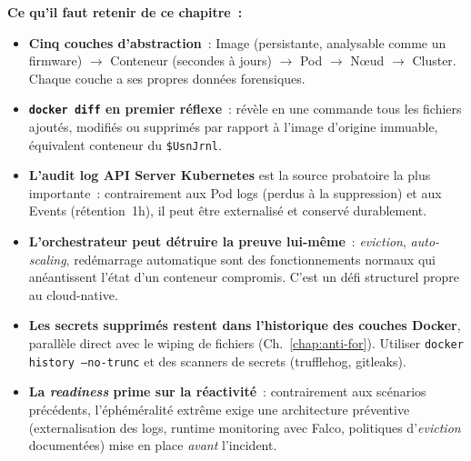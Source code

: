 \begin{boxresume}
\textbf{Ce qu'il faut retenir de ce chapitre~:}
\begin{itemize}
    \item \textbf{Cinq couches d'abstraction}~: Image (persistante,
          analysable comme un firmware) $\to$ Conteneur (secondes
          à jours) $\to$ Pod $\to$ N\oe ud $\to$ Cluster. Chaque
          couche a ses propres données forensiques.

    \item \textbf{\texttt{docker diff} en premier réflexe}~: révèle
          en une commande tous les fichiers ajoutés, modifiés ou
          supprimés par rapport à l'image d'origine immuable, équivalent conteneur du \texttt{\$UsnJrnl}.

    \item \textbf{L'audit log API Server Kubernetes} est la source
          probatoire la plus importante~: contrairement aux Pod logs
          (perdus à la suppression) et aux Events (rétention~1h),
          il peut être externalisé et conservé durablement.

    \item \textbf{L'orchestrateur peut détruire la preuve lui-même}~:
          \textit{eviction}, \textit{auto-scaling}, redémarrage
          automatique sont des fonctionnements normaux qui
          anéantissent l'état d'un conteneur compromis. C'est
          un défi structurel propre au cloud-native.

    \item \textbf{Les secrets supprimés restent dans l'historique
          des couches Docker}, parallèle direct avec le wiping
          de fichiers (Ch.~\ref{chap:anti-for}). Utiliser
          \texttt{docker history --no-trunc} et des scanners
          de secrets (trufflehog, gitleaks).

    \item \textbf{La \textit{readiness} prime sur la réactivité}~:
          contrairement aux scénarios précédents, l'éphéméralité
          extrême exige une architecture préventive (externalisation
          des logs, runtime monitoring avec Falco, politiques
          d'\textit{eviction} documentées) mise en place
          \emph{avant} l'incident.
\end{itemize}
\end{boxresume}

\bigskip

